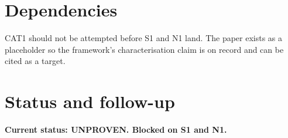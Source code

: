 \documentclass[11pt]{article}
\theoremstyle{plain}
\theoremstyle{definition}
\begin{document}
\section{Dependencies}

CAT1 should not be attempted before S1 and N1 land. The paper exists
as a placeholder so the framework's characterisation claim is on
record and can be cited as a target.

\section{Status and follow-up}

\textbf{Current status: UNPROVEN. Blocked on S1 and N1.}



\end{document}
